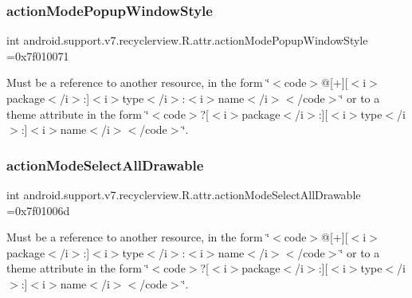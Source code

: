 \subsubsection{\texorpdfstring{action\+Mode\+Popup\+Window\+Style}{actionModePopupWindowStyle}}
{\footnotesize\ttfamily int android.\+support.\+v7.\+recyclerview.\+R.\+attr.\+action\+Mode\+Popup\+Window\+Style =0x7f010071\hspace{0.3cm}{\ttfamily [static]}}

Must be a reference to another resource, in the form \char`\"{}$<$code$>$@\mbox{[}+\mbox{]}\mbox{[}$<$i$>$package$<$/i$>$\+:\mbox{]}$<$i$>$type$<$/i$>$\+:$<$i$>$name$<$/i$>$$<$/code$>$\char`\"{} or to a theme attribute in the form \char`\"{}$<$code$>$?\mbox{[}$<$i$>$package$<$/i$>$\+:\mbox{]}\mbox{[}$<$i$>$type$<$/i$>$\+:\mbox{]}$<$i$>$name$<$/i$>$$<$/code$>$\char`\"{}. \mbox{\label{classandroid_1_1support_1_1v7_1_1recyclerview_1_1R_1_1attr_a66819cc6a3271b769b6d8b93f97b3cb8}} 
\subsubsection{\texorpdfstring{action\+Mode\+Select\+All\+Drawable}{actionModeSelectAllDrawable}}
{\footnotesize\ttfamily int android.\+support.\+v7.\+recyclerview.\+R.\+attr.\+action\+Mode\+Select\+All\+Drawable =0x7f01006d\hspace{0.3cm}{\ttfamily [static]}}

Must be a reference to another resource, in the form \char`\"{}$<$code$>$@\mbox{[}+\mbox{]}\mbox{[}$<$i$>$package$<$/i$>$\+:\mbox{]}$<$i$>$type$<$/i$>$\+:$<$i$>$name$<$/i$>$$<$/code$>$\char`\"{} or to a theme attribute in the form \char`\"{}$<$code$>$?\mbox{[}$<$i$>$package$<$/i$>$\+:\mbox{]}\mbox{[}$<$i$>$type$<$/i$>$\+:\mbox{]}$<$i$>$name$<$/i$>$$<$/code$>$\char`\"{}. \mbox{\label{classandroid_1_1support_1_1v7_1_1recyclerview_1_1R_1_1attr_aae6bbd600de430ed59e1fa94f11f5eb0}} 
